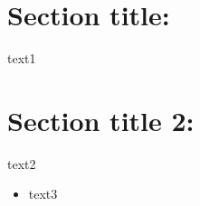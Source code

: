 \documentclass{article}
\begin{document}
\section{Section title:} text1

\section{Section title 2:} text2

\begin{itemize}
  \item text3
\end{itemize}
\end{document}
